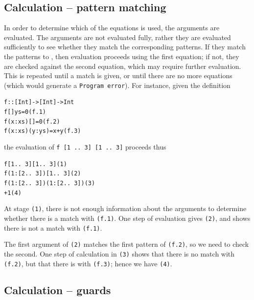 \subsection*{Calculation -- pattern matching}

In order to determine which of the equations is used, the arguments are
evaluated. The arguments are not evaluated fully, rather they are
evaluated sufficiently to see whether they match the corresponding patterns.
If they match the patterns \texttt{} to \texttt{},
then evaluation proceeds using the first equation; if not, they are checked
against the second equation, which may require further evaluation. This is
repeated until a match is given, or until there are no more equations (which would
generate a \texttt{Program  error}). For instance,
given the definition
\begin{alltt}
f :: [Int] -> [Int] -> Int
f [] ys         = 0 \hfill (f.1)
f (x:xs) []     = 0 \hfill (f.2)
f (x:xs) (y:ys) = x+y \hfill (f.3)
\end{alltt}
the evaluation of \texttt{f [1 ..\ 3] [1 ..\ 3]} proceeds thus
\begin{alltt}
f [1 ..\ 3] [1 ..\ 3]\hfill (1)
\step f (1:[2 ..\ 3]) [1 ..\ 3]\hfill (2)
\step f (1:[2 ..\ 3]) (1:[2 ..\ 3])\hfill (3)
+1\hfill (4)
\end{alltt}
At stage \texttt{(1)}, there is not enough information about the arguments to
determine whether there is a match with \texttt{(f.1)}. One step of evaluation
gives \texttt{(2)}, and shows there is not a match with \texttt{(f.1)}.

The first argument of \texttt{(2)} matches the first pattern of \texttt{(f.2)}, so
we need to check the second. One step of calculation in \texttt{(3)} shows that
there is no match with \texttt{(f.2)}, but that there is with \texttt{(f.3)}; hence we
have \texttt{(4)}.

\subsection*{Calculation -- guards}

